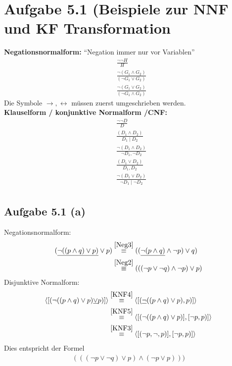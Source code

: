\documentclass[12pt,a4paper]{article}
\author{Willi Sontopski}
\begin{document}

\section*{Aufgabe 5.1 (Beispiele zur NNF und KF Transformation}
\textbf{Negationsnormalform:} ``Negation immer nur vor Variablen''\\
\begin{align}
&\frac{\neg\neg H}{H}\label{Neg1}\\
&\frac{\neg(G_1\wedge G_2)}{(\neg G_1\vee G_2)}\label{Neg2}\\
&\frac{\neg(G_1\vee G_2)}{(\neg G_1\wedge G_2)}\label{Neg3}
\end{align}
Die Symbole $\to, \leftrightarrow$ müssen zuerst umgeschrieben werden.\\

\textbf{Klauselform / konjunktive Normalform /CNF:}\\
\begin{align}
&\frac{\neg\neg D}{D}\label{KNF1}\tag{KNF1}\\
&\frac{(D_1\wedge D_2)}{D_1\mid D_2}\label{KNF2}\tag{KNF2}\\
&\frac{\neg(D_1\wedge D_2)}{\neg D_1,\neg D_2}\label{KNF3}\tag{KNF3}\\
&\frac{(D_1\vee D_2)}{D_1, D_2}\label{KNF4}\tag{KNF4}\\
&\frac{\neg(D_1\vee D_2)}{\neg D_1\mid\neg D_2}\label{KNF5}\tag{KNF5}\\
\end{align}

\subsection*{Aufgabe 5.1 (a)}
Negationsnormalform:
\begin{align*}
(\underline{\neg (( p\wedge q)\vee p)}\vee p)
&\stackrel{\ref{Neg3}}{\equiv}
((\underline{\neg(p\wedge q)}\wedge\neg p)\vee q)\\
&\stackrel{\ref{Neg2}}{\equiv}
(((\neg p\vee \neg q)\wedge\neg p)\vee p)
\end{align*}
Disjunktive Normalform:
\begin{align*}
\langle[(\neg (( p\wedge q)\vee p)\underline{\vee} p)]\rangle
&\stackrel{\ref{KNF4}}{\equiv}
\langle[(\underline{\neg} (( p\wedge q)\vee p), p)]\rangle\\
&\stackrel{\ref{KNF5}}{\equiv}
\langle[(\neg (( p\wedge q)\vee p)],[\neg p,p)]\rangle\\
&\stackrel{\ref{KNF3}}{\equiv}
\langle[(\neg p,\neg, p)],[\neg p,p)]\rangle\\
\end{align*}
Dies entspricht der Formel
\begin{align*}
(((\neg p\vee\neg q)\vee p)\wedge(\neg p\vee p)))
\end{align*}
\end{document}
